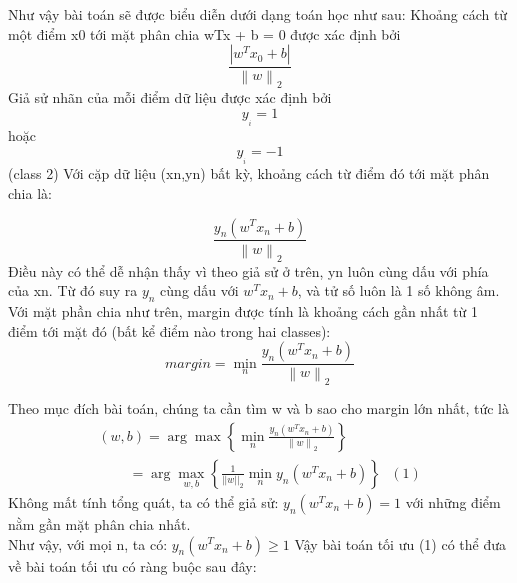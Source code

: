 \documentclass[10pt,conference,a4paper]{IEEEtran}
\begin{document}
Như vậy bài toán sẽ được biểu diễn dưới dạng toán học như sau:
Khoảng cách từ một điểm x0 tới mặt phân chia wTx + b = 0 được xác định bởi\\
\[\frac{{\left| {{w^T}{x_0} + b} \right|}}{{{{\left\| w \right\|}_2}}}\]
Giả sử nhãn của mỗi điểm dữ liệu được xác định bởi \[{y_{_i}} = 1\] hoặc \[{y_{_i}} =  - 1\] (class 2)
Với cặp dữ liệu (xn,yn) bất kỳ, khoảng cách từ điểm đó tới mặt phân chia là:


\[\frac{{{y_n}\left( {{w^T}{x_n} + b} \right)}}{{{{\left\| w \right\|}_2}}}\]
Điều này có thể dễ nhận thấy vì theo giả sử ở trên, yn luôn cùng dấu với phía của xn. Từ đó suy ra ${y_n}$ cùng dấu với ${w^T}{x_n} + b$, và tử số luôn là 1 số không âm.
Với mặt phần chia như trên, margin được tính là khoảng cách gần nhất từ 1 điểm tới mặt đó (bất kể điểm nào trong hai classes):
\[margin = \mathop {\min }\limits_n \frac{{{y_n}\left( {{w^T}{x_n} + b} \right)}}{{{{\left\| w \right\|}_2}}}\]


Theo mục đích bài toán, chúng ta cần tìm w và b sao cho margin lớn nhất, tức là
\[\begin{array}{l}
\left( {w,b} \right) = \arg \max \left\{ {\mathop {\min }\limits_n \frac{{{y_n}\left( {{w^T}{x_n} + b} \right)}}{{{{\left\| w \right\|}_2}}}} \right\}\\
\,\,\,\,\,\,\,\,\,\,\,\,\, = \arg \mathop {\max }\limits_{w,b} \left\{ {\frac{1}{{{{\left| {\left| w \right|} \right|}_2}}}\mathop {\min }\limits_n {y_n}\left( {{w^T}{x_n} + b} \right)} \right\}\,\,\,\,\left( 1 \right)
\end{array}\]
Không mất tính tổng quát, ta có thể giả sử: ${y_n}\left( {{w^T}{x_n} + b} \right) = 1$ với những điểm nằm gần mặt phân chia nhất.\\

Như vậy, với mọi n, ta có: $ {y_n}\left( {{w^T}{x_n} + b} \right) \ge 1 $
Vậy bài toán tối ưu (1) có thể đưa về bài toán tối ưu có ràng buộc sau đây:
\end{document}
